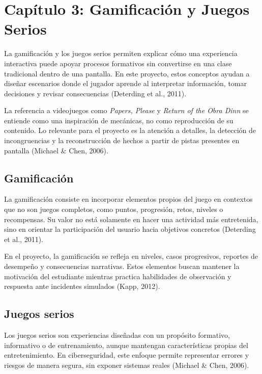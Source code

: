 \newpage

\section[Cap\'{i}tulo 3: Gamificaci\'{o}n y Juegos Serios]{\centering Cap\'{i}tulo 3: Gamificaci\'{o}n y Juegos Serios}

La gamificaci\'{o}n y los juegos serios permiten explicar c\'{o}mo una experiencia interactiva puede apoyar procesos formativos sin convertirse en una clase tradicional dentro de una pantalla. En este proyecto, estos conceptos ayudan a dise\~{n}ar escenarios donde el jugador aprende al interpretar informaci\'{o}n, tomar decisiones y revisar consecuencias (Deterding et al., 2011).

La referencia a videojuegos como \textit{Papers, Please} y \textit{Return of the Obra Dinn} se entiende como una inspiraci\'{o}n de mec\'{a}nicas, no como reproducci\'{o}n de su contenido. Lo relevante para el proyecto es la atenci\'{o}n a detalles, la detecci\'{o}n de incongruencias y la reconstrucci\'{o}n de hechos a partir de pistas presentes en pantalla (Michael \& Chen, 2006).

\subsection{Gamificaci\'{o}n}

La gamificaci\'{o}n consiste en incorporar elementos propios del juego en contextos que no son juegos completos, como puntos, progresi\'{o}n, retos, niveles o recompensas. Su valor no est\'{a} solamente en hacer una actividad m\'{a}s entretenida, sino en orientar la participaci\'{o}n del usuario hacia objetivos concretos (Deterding et al., 2011).

En el proyecto, la gamificaci\'{o}n se refleja en niveles, casos progresivos, reportes de desempe\~{n}o y consecuencias narrativas. Estos elementos buscan mantener la motivaci\'{o}n del estudiante mientras practica habilidades de observaci\'{o}n y respuesta ante incidentes simulados (Kapp, 2012).

\subsection{Juegos serios}

Los juegos serios son experiencias dise\~{n}adas con un prop\'{o}sito formativo, informativo o de entrenamiento, aunque mantengan caracter\'{i}sticas propias del entretenimiento. En ciberseguridad, este enfoque permite representar errores y riesgos de manera segura, sin exponer sistemas reales (Michael \& Chen, 2006).

